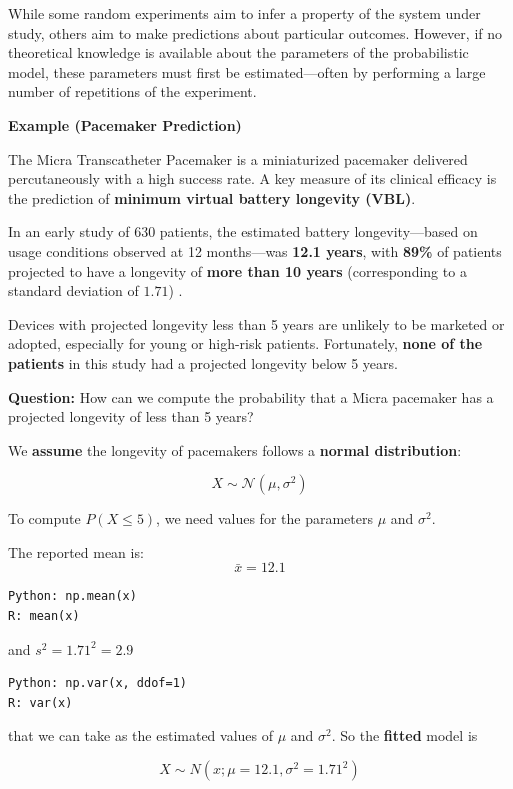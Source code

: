 \documentclass[
]{book}
\begin{document}
While some random experiments aim to infer a property of the system under study, others aim to make predictions about particular outcomes. However, if no theoretical knowledge is available about the parameters of the probabilistic model, these parameters must first be estimated---often by performing a large number of repetitions of the experiment.

\textbf{Example (Pacemaker Prediction)}

The Micra Transcatheter Pacemaker is a miniaturized pacemaker delivered percutaneously with a high success rate. A key measure of its clinical efficacy is the prediction of \textbf{minimum virtual battery longevity (VBL)}.

In an early study of 630 patients, the estimated battery longevity---based on usage conditions observed at 12 months---was \textbf{12.1 years}, with \textbf{89\%} of patients projected to have a longevity of \textbf{more than 10 years} (corresponding to a standard deviation of \(1.71\)) \citep{Duray2017Micra12mo}.

Devices with projected longevity less than 5 years are unlikely to be marketed or adopted, especially for young or high-risk patients. Fortunately, \textbf{none of the patients} in this study had a projected longevity below 5 years.

\textbf{Question:} How can we compute the probability that a Micra pacemaker has a projected longevity of less than 5 years?

We \textbf{assume} the longevity of pacemakers follows a \textbf{normal distribution}:

\[
X \sim \mathcal{N}(\mu, \sigma^2)
\]

To compute \(P(X \leq 5)\), we need values for the parameters \(\mu\) and \(\sigma^2\).

The reported mean is:\\
\[
  \bar{x} = 12.1
  \]

\begin{verbatim}
Python: np.mean(x)
R: mean(x)
\end{verbatim}

and \(s^2=1.71^2=2.9\)

\begin{verbatim}
Python: np.var(x, ddof=1)
R: var(x)
\end{verbatim}

that we can take as the estimated values of \(\mu\) and \(\sigma^2\). So the \textbf{fitted} model is

\[X \sim N(x; \mu=12.1, \sigma^2=1.71^2)\]
\end{document}
